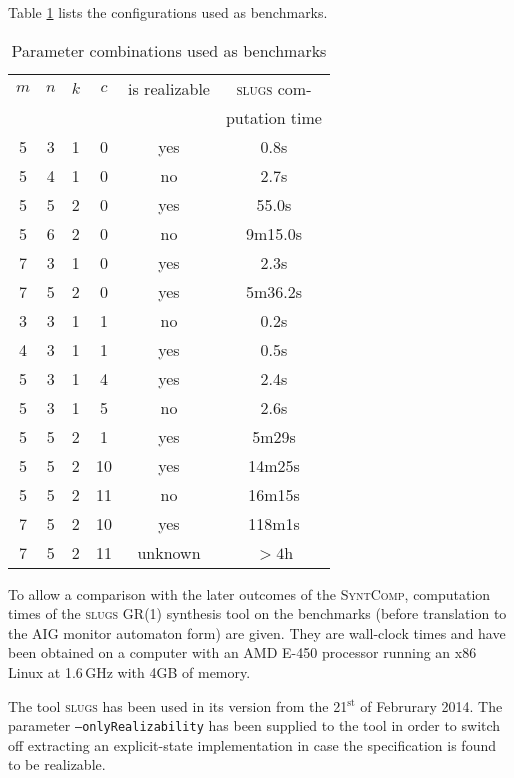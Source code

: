 \documentclass[a4paper,10pt]{IEEEtran}
\newcommand{\SyntComp}{\textsc{SyntComp}}
\begin{document}
\noindent Table \ref{tab:benchmarks} lists the configurations used as benchmarks.
%
\begin{table}[b]
\normalsize
\begin{center}
\begin{tabular}{c|c|c|c||c|c}
$m$ & $n$ & $k$ & $c$ & is realizable & \textsc{slugs} com- \\ & & & & & putation time\\ \hline \hline
5 & 3 & 1 & 0 & yes & 0.8s \\ \hline
5 & 4 & 1 & 0 & no & 2.7s \\ \hline
5 & 5 & 2 & 0 & yes & 55.0s \\ \hline
5 & 6 & 2 & 0 & no & 9m15.0s \\ \hline 
7 & 3 & 1 & 0 & yes & 2.3s \\ \hline 
7 & 5 & 2 & 0 & yes & 5m36.2s \\ \hline 
\hline
3 & 3 & 1 & 1 & no & 0.2s \\ \hline
4 & 3 & 1 & 1 & yes & 0.5s \\ \hline
5 & 3 & 1 & 4 & yes & 2.4s \\ \hline
5 & 3 & 1 & 5 & no & 2.6s \\ \hline
5 & 5 & 2 & 1 & yes & 5m29s \\ \hline
5 & 5 & 2 & 10 & yes & 14m25s \\ \hline
5 & 5 & 2 & 11 & no & 16m15s \\ \hline
7 & 5 & 2 & 10 & yes & 118m1s \\ \hline 
7 & 5 & 2 & 11 & unknown & $>4$h \\ \hline 
\end{tabular}
\end{center}
\caption{Parameter combinations used as benchmarks}
\label{tab:benchmarks}
\end{table}
%
To allow a comparison with the later outcomes of the \SyntComp{}, computation times of the \textsc{slugs} GR(1) synthesis tool on the benchmarks (before translation to the AIG monitor automaton form) are given. They are wall-clock times and have been obtained on a computer with an AMD E-450 processor running an x86 Linux at 1.6\,GHz with 4GB of memory.

The tool \textsc{slugs} has been used in its version from the 21$^\mathrm{st}$ of Februrary 2014. The parameter \texttt{--onlyRealizability} has been supplied to the tool in order to switch off extracting an explicit-state implementation in case the specification is found to be realizable.



\end{document}
